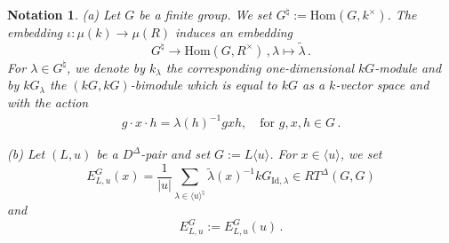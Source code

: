 \documentclass[11pt]{article}
\theoremstyle{change}  %
\newtheorem{notation}[theorem]{Notation}
\newcommand{\Hom}{\mathrm{Hom}}
\newcommand{\DD}{D^{\Delta}}
\newcommand{\TD}{T^{\Delta}}
\def\Lu{L\langle u\rangle}
\begin{document}
\begin{notation}
\smallskip
{\rm (a)} Let $G$ be a finite group. We set $G^\natural:=\Hom(G,k^\times)$. 
The embedding $\iota\colon \mu(k)\to \mu(R)$ induces an embedding 
$$G^\natural\to \Hom(G, R^\times)\,, \lambda\mapsto \tilde{\lambda}\,.$$
For $\lambda\in G^\natural$, we denote by $k_\lambda$ the corresponding one-dimensional $kG$-module and by $kG_{\lambda}$ the $(kG,kG)$-bimodule which is equal to $kG$ as a $k$-vector space and with the action 
\begin{align*}
	g\cdot x\cdot h=\lambda(h)^{-1}gxh, \quad\text{for } g,x,h\in G\,.
\end{align*}


\smallskip
{\rm (b)} Let $(L,u)$ be a $\DD$-pair and set $G:=\Lu$. For $x\in \langle u\rangle$, we set 
\begin{equation*}
	E^G_{L,u}(x)=\frac{1}{|u|}\sum_{\lambda\in \langle u\rangle^\natural}\tilde{\lambda}(x)^{-1} kG_{\mathrm{Id},\lambda}\in R\TD(G,G)
\end{equation*}
and
\begin{equation*}
   E^G_{L,u}:= E^G_{L,u}(u)\,.
\end{equation*}
\end{notation}
\end{document}
